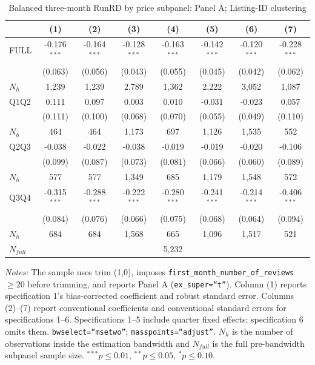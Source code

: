 \begin{table}[!htbp]
\centering
\caption{Balanced three-month RunRD by price subpanel: Panel A; Listing-ID clustering}
\scriptsize
\setlength{\tabcolsep}{5pt}
\begin{tabular}{l*{7}{c}}
\toprule
 & (1) & (2) & (3) & (4) & (5) & (6) & (7) \\
\midrule
FULL & -0.176$^{***}$ & -0.164$^{***}$ & -0.128$^{***}$ & -0.163$^{***}$ & -0.142$^{***}$ & -0.120$^{***}$ & -0.228$^{***}$ \\
 & (0.063) & (0.056) & (0.043) & (0.055) & (0.045) & (0.042) & (0.062) \\
$N_h$ & 1,239 & 1,239 & 2,789 & 1,362 & 2,222 & 3,052 & 1,087 \\
\addlinespace
Q1Q2 & 0.111 & 0.097 & 0.003 & 0.010 & -0.031 & -0.023 & 0.057 \\
 & (0.111) & (0.100) & (0.068) & (0.070) & (0.055) & (0.049) & (0.110) \\
$N_h$ & 464 & 464 & 1,173 & 697 & 1,126 & 1,535 & 552 \\
\addlinespace
Q2Q3 & -0.038 & -0.022 & -0.038 & -0.019 & -0.019 & -0.020 & -0.106 \\
 & (0.099) & (0.087) & (0.073) & (0.081) & (0.066) & (0.060) & (0.089) \\
$N_h$ & 577 & 577 & 1,349 & 685 & 1,179 & 1,548 & 572 \\
\addlinespace
Q3Q4 & -0.315$^{***}$ & -0.288$^{***}$ & -0.222$^{***}$ & -0.280$^{***}$ & -0.241$^{***}$ & -0.214$^{***}$ & -0.406$^{***}$ \\
 & (0.084) & (0.076) & (0.066) & (0.075) & (0.068) & (0.064) & (0.094) \\
$N_h$ & 684 & 684 & 1,568 & 665 & 1,096 & 1,517 & 521 \\

\midrule
$N_{full}$ & \multicolumn{7}{c}{5,232} \\
\bottomrule
\end{tabular}
\begin{minipage}{0.98\textwidth}
\footnotesize
\textit{Notes:} The sample uses trim (1,0), imposes \texttt{first\_month\_number\_of\_reviews}$\geq20$ before trimming, and reports Panel A (\texttt{ex\_super=``t''}). Column (1) reports specification 1's bias-corrected coefficient and robust standard error. Columns (2)--(7) report conventional coefficients and conventional standard errors for specifications 1--6. Specifications 1--5 include quarter fixed effects; specification 6 omits them. \texttt{bwselect=``msetwo''}; \texttt{masspoints=``adjust''}. $N_h$ is the number of observations inside the estimation bandwidth and $N_{full}$ is the full pre-bandwidth subpanel sample size. $^{***}p\leq0.01$, $^{**}p\leq0.05$, $^{*}p\leq0.10$.
\end{minipage}
\end{table}
\clearpage

